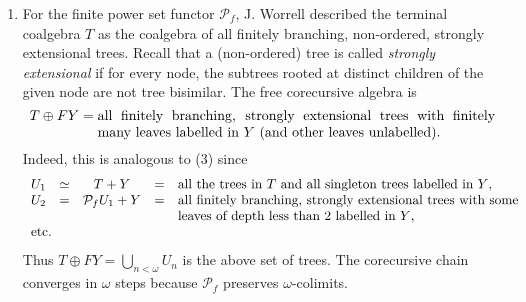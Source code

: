 \documentclass{LMCS}
\theoremstyle{plain}
\theoremstyle{definition}
\numberwithin{equation}{section}
\begin{document}
\begin{exa}
\begin{enumerate}
\item For the finite power set functor $\mathcal P_f$, J. Worrell
\cite{w} described the terminal coalgebra $T$ as the coalgebra of all finitely branching,
non-ordered, strongly extensional  trees. Recall that a (non-ordered)
tree is called {\it strongly extensional} if for every node, the subtrees rooted at distinct children of the given node are not tree bisimilar. The free corecursive algebra is
\[
T\oplus FY =
\parbox[t]{10cm}{all finitely branching, strongly extensional trees with finitely
 \quad many leaves labelled in $Y$ (and other leaves unlabelled).
}
\]
Indeed, this is analogous to (3) since
\[
\begin{array}{rcccp{9cm}}
  U_1 & \simeq & T+Y & = & all the trees in $T$ and all singleton
  trees labelled in $Y$,\\
  U_2 & = & \mathcal P_fU_1+Y & = &
  all finitely branching, strongly extensional trees with
  some leaves of depth less than $2$ labelled in $Y$,
  \\
  \multicolumn{2}{l}{\textrm{etc.}}
\end{array}
\]
Thus $T\oplus FY=\bigcup_{n<\omega}U_n$ is the above set of trees. The
corecursive chain converges in $\omega$ steps  because $\mathcal P_f$
preserves $\omega$-colimits.
\end{enumerate}
\end{exa}
\end{document}
